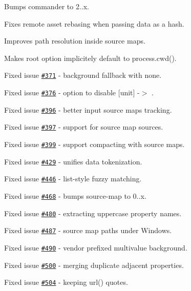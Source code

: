 \begin{DoxyItemize}
\item Bumps commander to 2..\+x.
\item Fixes remote asset rebasing when passing data as a hash.
\item Improves path resolution inside source maps.
\item Makes {\ttfamily root} option implicitely default to {\ttfamily process.\+cwd()}.
\item Fixed issue \href{https://github.com/jakubpawlowicz/clean-css/issues/371}{\tt \#371} -\/ {\ttfamily background} fallback with {\ttfamily none}.
\item Fixed issue \href{https://github.com/jakubpawlowicz/clean-css/issues/376}{\tt \#376} -\/ option to disable {\mbox{[}unit\mbox{]}} -\/$>$ {}.
\item Fixed issue \href{https://github.com/jakubpawlowicz/clean-css/issues/396}{\tt \#396} -\/ better input source maps tracking.
\item Fixed issue \href{https://github.com/jakubpawlowicz/clean-css/issues/397}{\tt \#397} -\/ support for source map sources.
\item Fixed issue \href{https://github.com/jakubpawlowicz/clean-css/issues/399}{\tt \#399} -\/ support compacting with source maps.
\item Fixed issue \href{https://github.com/jakubpawlowicz/clean-css/issues/429}{\tt \#429} -\/ unifies data tokenization.
\item Fixed issue \href{https://github.com/jakubpawlowicz/clean-css/issues/446}{\tt \#446} -\/ {\ttfamily list-\/style} fuzzy matching.
\item Fixed issue \href{https://github.com/jakubpawlowicz/clean-css/issues/468}{\tt \#468} -\/ bumps {\ttfamily source-\/map} to 0..\+x.
\item Fixed issue \href{https://github.com/jakubpawlowicz/clean-css/issues/480}{\tt \#480} -\/ extracting uppercase property names.
\item Fixed issue \href{https://github.com/jakubpawlowicz/clean-css/issues/487}{\tt \#487} -\/ source map paths under Windows.
\item Fixed issue \href{https://github.com/jakubpawlowicz/clean-css/issues/490}{\tt \#490} -\/ vendor prefixed multivalue {\ttfamily background}.
\item Fixed issue \href{https://github.com/jakubpawlowicz/clean-css/issues/500}{\tt \#500} -\/ merging duplicate adjacent properties.
\item Fixed issue \href{https://github.com/jakubpawlowicz/clean-css/issues/504}{\tt \#504} -\/ keeping {\ttfamily url()} quotes.

\end{DoxyItemize}

